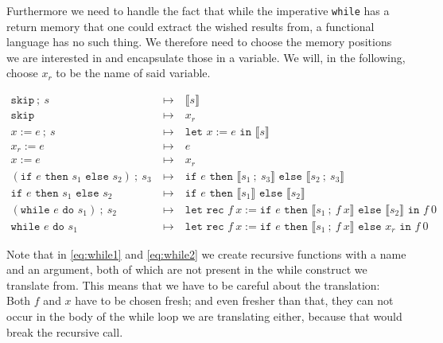 \documentclass[11pt, leqno]{article}
\theoremstyle{definition}
\begin{document}
Furthermore we need to handle the fact that while the imperative \texttt{while} has a
return memory that one could extract the wished results from, a functional language
has no such thing. We therefore need to choose the memory positions we are interested
in and encapsulate those in a variable. We will, in the following, choose $x_r$ to be
the name of said variable. 

\begin{align}
  \label{eq:transwhile}
  \texttt{skip}~;~s & ~\mapsto~ & \llbracket s \rrbracket\\
  \texttt{skip}     & ~\mapsto~ & x_r\\
  x := e~;~s        & ~\mapsto~ & \texttt{let } x := e \texttt{ in }\llbracket s \rrbracket\\
  x_r := e          & ~\mapsto~ & e \\
  x := e            & ~\mapsto~ & x_r \\
  (\texttt{if } e \texttt{ then } s_1 \texttt{ else } s_2) ~;~s_3
                    & ~\mapsto~ & \texttt{if } e
                                  \texttt{ then } \llbracket s_1 ~;~ s_3 \rrbracket
                                  \texttt{ else } \llbracket s_2 ~;~ s_3 \rrbracket \\
  \texttt{if } e \texttt{ then } s_1 \texttt{ else } s_2
                    & ~\mapsto~ & \texttt{if } e
                                  \texttt{ then } \llbracket s_1 \rrbracket
                                  \texttt{ else } \llbracket s_2 \rrbracket \\
  (\texttt{while } e \texttt{ do } s_1) ~;~ s_2
                    & ~\mapsto~ & \texttt{let rec } f~x :=
                                  \texttt{if } e
                                  \texttt{ then } \llbracket s_1 ~;~ f~x \rrbracket
                                  \texttt{ else } \llbracket s_2 \rrbracket \label{eq:while1}
                                  \texttt{ in } f~0\\
  \texttt{while } e \texttt{ do } s_1
                    & ~\mapsto~ & \texttt{let rec } f~x :=
                                  \texttt{if } e
                                  \texttt{ then } \llbracket s_1 ~;~ f~x \rrbracket
                                  \texttt{ else } x_r \label{eq:while2}
                                  \texttt{ in } f~0
\end{align}

Note that in \ref{eq:while1} and \ref{eq:while2} we create recursive functions with a
name and an argument, both of which are not present in the while construct we
translate from. This means that we have to be careful about the translation: Both $f$
and $x$ have to be chosen fresh; and even fresher than that, they can not occur in
the body of the while loop we are translating either, because that would break the
recursive call.
\end{document}
